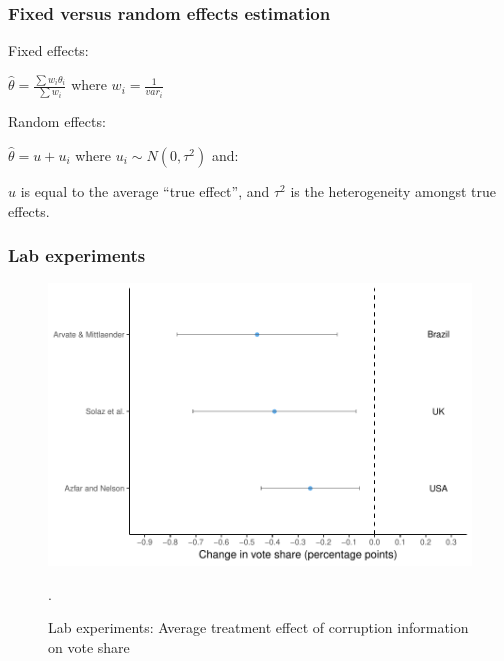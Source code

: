 \documentclass[usenames,dvipsnames]{beamer}
\begin{document}
\begin{frame}[label=fixed_random, noframenumbering]
\frametitle{Fixed versus random effects estimation \hyperlink{methods_2}{}}

Fixed effects: \\
\vspace{0.25cm}

$\hat{\theta} = \frac{\sum w_i \theta_i}{\sum w_i}$ where $w_i = \frac{1}{var_i}$ \\

\vspace{0.5cm}

Random effects: \\
\vspace{0.25cm}

$\hat{\theta} = u + u_i$ where $u_i \sim N(0, \tau^2)$ and: \\

\vspace{0.25cm}

$u$ is equal to the average ``true effect'', and $\tau^2$ is the heterogeneity amongst true effects. 

\end{frame}


\begin{frame}[label=lab, noframenumbering]
\frametitle{Lab experiments \hyperlink{results}{}}

\begin{figure}[!htb]
\includegraphics[scale=0.65]{../figs/lab.pdf}
\vspace{0.2cm}
\caption{Lab experiments: Average treatment effect of corruption information on vote share}.
\small
\vspace{-0.3cm}
\label{fig: lab}
\end{figure}
\end{frame}
\end{document}
